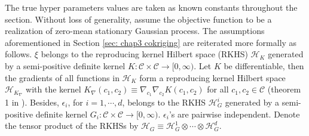 The true hyper parameters values are taken as known constants throughout the section.
Without loss of generality, assume the objective function to be a realization of 
zero-mean stationary Gaussian process.
The assumptions aforementioned
in Section \ref{sec: chap3 cokriging} are reiterated more formally as follows.
$\xi$ 
belongs to the reproducing kernel Hilbert space (RKHS) $\mathcal{H}_K$ generated by a
semi-positive definite
kernel $K: \mathcal{C}\times \mathcal{C} \rightarrow [0,\infty)$.
Let $K$ be differentiable, then the gradients of all functions in $\mathcal{H}_K$
form a reproducing kernel Hilbert space $\mathcal{H}_{K_\nabla}$ with
the kernel $K_\nabla(c_1,c_2) \equiv \nabla_{c_1}\nabla_{c_2}K(c_1, c_2)$ 
for all $c_1,c_2\in \mathcal{C}$ (theorem 1 in \cite{derivative RKHS}).
Besides, $\epsilon_i$, for $i=1,\cdots, d$, belongs to the RKHS
$\mathcal{H}_{G}^i$ generated by a semi-positive definite
kernel $G_i: \mathcal{C}\times \mathcal{C} \rightarrow [0, \infty)$. $\epsilon_i$'s are pairwise
independent. 
Denote the tensor product of the RKHSs
by $\mathcal{H}_G \equiv \mathcal{H}_{G}^1 \otimes \cdots \otimes \mathcal{H}_G^d$.\\

